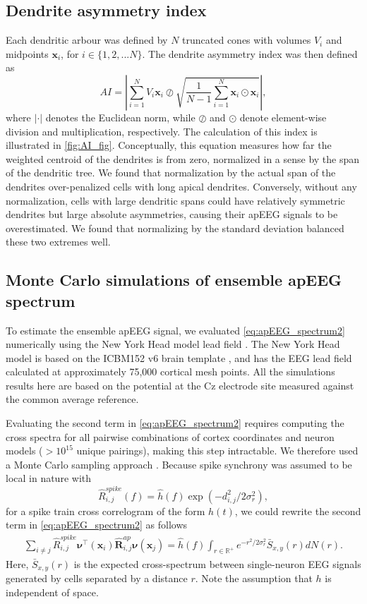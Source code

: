 \subsection{Dendrite asymmetry index}
Each dendritic arbour was defined by $N$ truncated cones with volumes $V_i$ and midpoints $\bm{x}_i$, for $i\in\{1,2,...N\}$. The dendrite asymmetry index was then defined as
\begin{equation} \label{eq:AI}
    AI = \left | \sum_{i=1}^N V_i \bm{x}_i \oslash \sqrt{\frac{1}{N-1} \sum_{i=1}^N \bm{x}_i \odot \bm{x}_i} \right |,
\end{equation}
where $\left | \cdot \right |$ denotes the Euclidean norm, while $\oslash$ and $\odot$ denote element-wise division and multiplication, respectively. The calculation of this index is illustrated in {\autoref{fig:AI_fig}}. Conceptually, this equation measures how far the weighted centroid of the dendrites is from zero, normalized in a sense by the span of the dendritic tree. We found that normalization by the actual span of the dendrites over-penalized cells with long apical dendrites. Conversely, without any normalization, cells with large dendritic spans could have relatively symmetric dendrites but large absolute asymmetries, causing their apEEG signals to be overestimated. We found that normalizing by the standard deviation balanced these two extremes well.

\subsection{Monte Carlo simulations of ensemble apEEG spectrum}
To estimate the ensemble apEEG signal, we evaluated {\ref{eq:apEEG_spectrum2}} numerically using the New York Head model lead field \cite{Huang2016}. The New York Head model is based on the ICBM152 v6 brain template \cite{Fonov2009,Fonov2011}, and has the EEG lead field calculated at approximately 75,000 cortical mesh points. All the simulations results here are based on the potential at the Cz electrode site measured against the common average reference.

Evaluating the second term in {\ref{eq:apEEG_spectrum2}} requires computing the cross spectra for all pairwise combinations of cortex coordinates and neuron models ($>10^{15}$ unique pairings), making this step intractable. We therefore used a Monte Carlo sampling approach \cite{Robert2004}. Because spike synchrony was assumed to be local in nature with
\begin{equation*}
    \hat{R}^{spike}_{i,j}(f) = \hat{h}(f) \exp(-d_{i,j}^2/2\sigma_r^2),
\end{equation*}
for a spike train cross correlogram of the form $h(t)$, we could rewrite the second term in {\ref{eq:apEEG_spectrum2}} as follows
\begin{align*}
    \sum_{i\ne j} \hat{R}^{spike}_{i,j} \bm{\nu}^\intercal(\bm{x}_i) \hat{\bm{R}}^{ap}_{i,j}\bm{\nu}(\bm{x}_j) = \hat{h}(f) \int_{r\in\mathbb{R}^+}  e^{-r^2/2\sigma_r^2} \bar{S}_{x,y}(r) dN(r).
\end{align*}
Here, $\bar{S}_{x,y}(r)$ is the expected cross-spectrum between single-neuron EEG signals generated by cells separated by a distance $r$. Note the assumption that $h$ is independent of space.

